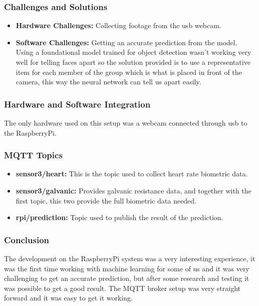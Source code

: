 \documentclass{article}
\begin{document}
\subsubsection{Challenges and Solutions}
\begin{itemize}
    \item \textbf{Hardware Challenges:} Collecting footage from the usb webcam.
    \item \textbf{Software Challenges:} Getting an accurate prediction from the model. Using a foundational model trained for object detection wasn't working very well for telling faces apart so the solution provided is to use a representative item for each member of the group which is what is placed in front of the camera, this way the neural network can tell us apart easily.
\end{itemize}

\subsubsection{Hardware and Software Integration}
The only hardware used on this setup was a webcam connected through usb to the RaspberryPi.

\subsubsection{MQTT Topics}
\begin{itemize}
    \item \textbf{sensor3/heart:} This is the topic used to collect heart rate biometric data.
    \item \textbf{sensor3/galvanic:} Provides galvanic resistance data, and together with the first topic, this two provide the full biometric data needed.
    \item \textbf{rpi/prediction:} Topic used to publish the result of the prediction.
\end{itemize}

\subsubsection{Conclusion}
The development on the RaspberryPi system was a very interesting experience, it was the first time working with machine learning for some of us and it was very challenging to get an accurate prediction, but after some research and testing it was possible to get a good result. The MQTT broker setup was very straight forward and it was easy to get it working.
\end{document}
